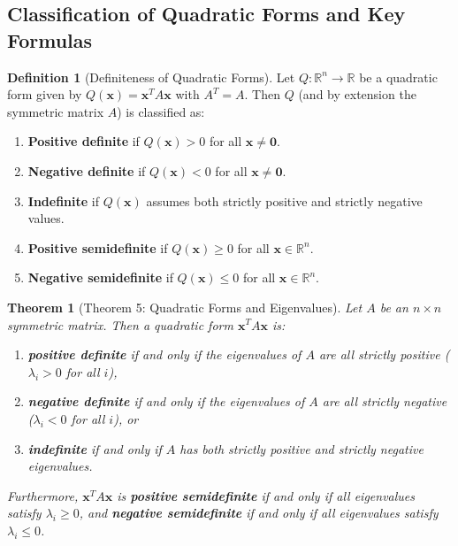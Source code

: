 \documentclass[11pt, letterpaper]{article}
\newtheorem{theorem}{Theorem}[section]
\theoremstyle{definition}
\newtheorem{definition}{Definition}[section]
\theoremstyle{remark}
\begin{document}
\subsection{Classification of Quadratic Forms and Key Formulas}
\begin{definition}[Definiteness of Quadratic Forms]
Let $Q : \mathbb{R}^n \to \mathbb{R}$ be a quadratic form given by $Q(\mathbf{x}) = \mathbf{x}^T A \mathbf{x}$ with $A^T = A$. Then $Q$ (and by extension the symmetric matrix $A$) is classified as:
\begin{enumerate}[label=\alph*.]
    \item \textbf{Positive definite} if $Q(\mathbf{x}) > 0$ for all $\mathbf{x} \neq \mathbf{0}$.
    \item \textbf{Negative definite} if $Q(\mathbf{x}) < 0$ for all $\mathbf{x} \neq \mathbf{0}$.
    \item \textbf{Indefinite} if $Q(\mathbf{x})$ assumes both strictly positive and strictly negative values.
    \item \textbf{Positive semidefinite} if $Q(\mathbf{x}) \ge 0$ for all $\mathbf{x} \in \mathbb{R}^n$.
    \item \textbf{Negative semidefinite} if $Q(\mathbf{x}) \le 0$ for all $\mathbf{x} \in \mathbb{R}^n$.
\end{enumerate}
\end{definition}

\begin{theorem}[Theorem 5: Quadratic Forms and Eigenvalues]
Let $A$ be an $n \times n$ symmetric matrix. Then a quadratic form $\mathbf{x}^T A \mathbf{x}$ is:
\begin{enumerate}[label=\alph*.]
    \item \textbf{positive definite} if and only if the eigenvalues of $A$ are all strictly positive ($\lambda_i > 0$ for all $i$),
    \item \textbf{negative definite} if and only if the eigenvalues of $A$ are all strictly negative ($\lambda_i < 0$ for all $i$), or
    \item \textbf{indefinite} if and only if $A$ has both strictly positive and strictly negative eigenvalues.
\end{enumerate}
Furthermore, $\mathbf{x}^T A \mathbf{x}$ is \textbf{positive semidefinite} if and only if all eigenvalues satisfy $\lambda_i \ge 0$, and \textbf{negative semidefinite} if and only if all eigenvalues satisfy $\lambda_i \le 0$.
\end{theorem}
\end{document}

